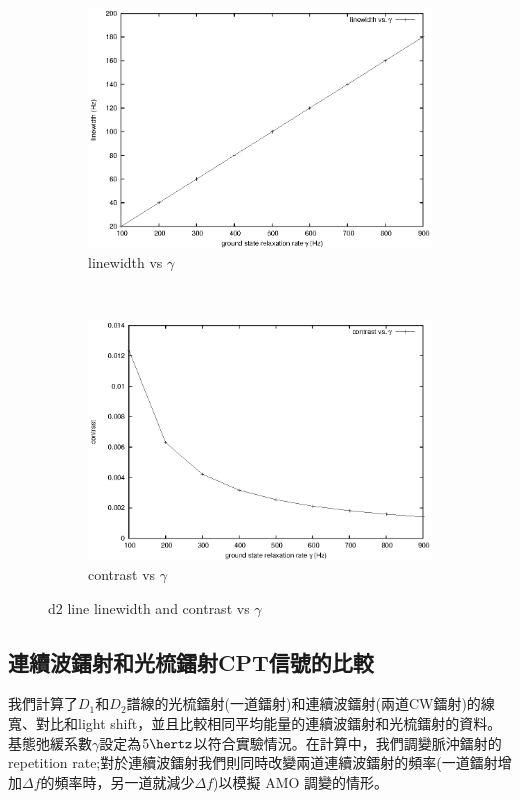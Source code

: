 \documentclass[11pt,a4paper]{article}
\begin{document}
\begin{figure}[H]
\centering
\begin{subfigure}[b]{0.6\textwidth}
\centering
\includegraphics[width=\textwidth]{d2_gamma/linewidth.eps}
\caption{linewidth vs $\gamma$}
\label{fig:linewidth_gamma}
\end{subfigure}\\
\begin{subfigure}[b]{0.6\textwidth}
\centering
\includegraphics[width=\textwidth]{d2_gamma/contrast.eps}
\caption{contrast vs $\gamma$}
\label{fig:contrast_gamma}
\end{subfigure}
\caption{d2 line linewidth and contrast vs $\gamma$}
\label{fig:gamma_relation}
\end{figure}

\subsection{連續波鐳射和光梳鐳射CPT信號的比較}
我們計算了$D_1$和$D_2$譜線的光梳鐳射(一道鐳射)和連續波鐳射(兩道CW鐳射)的線寬、對比和light shift，並且比較相同平均能量的連續波鐳射和光梳鐳射的資料。基態弛緩系數$\gamma$設定為$5 \hertz$以符合實驗情況。在計算中，我們調變脈沖鐳射的 repetition rate;對於連續波鐳射我們則同時改變兩道連續波鐳射的頻率(一道鐳射增加$\Delta f$的頻率時，另一道就減少$\Delta f$)以模擬 AMO 調變的情形。\\
\end{document}
